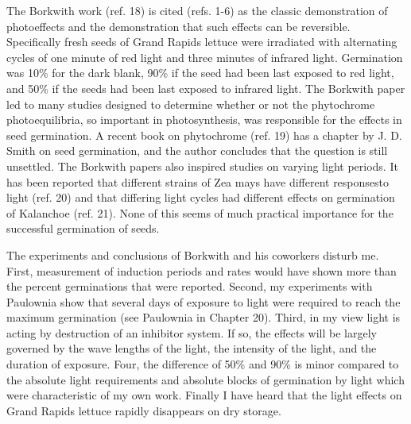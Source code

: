 The Borkwith work (ref. 18) is cited (refs. 1-6) as the classic demonstration of
photoeffects and the demonstration that such effects can be reversible. Specifically
fresh seeds of Grand Rapids lettuce were irradiated with alternating cycles of one
minute of red light and three minutes of infrared light. Germination was 10\% for the
dark blank, 90\% if the seed had been last exposed to red light, and 50\% if the seeds
had been last exposed to infrared light. The Borkwith paper led to many studies
designed to determine whether or not the phytochrome photoequilibria, so important in
photosynthesis, was responsible for the effects in seed germination. A recent book on
phytochrome (ref. 19) has a chapter by J. D. Smith on seed germination, and the
author concludes that the question is still unsettled. The Borkwith papers also inspired
studies on varying light periods. It has been reported that different strains of Zea mays
have different responsesto light (ref. 20) and that differing light cycles had different
effects on germination of Kalanchoe (ref. 21). None of this seems of much practical
importance for the successful germination of seeds.

The experiments and conclusions of Borkwith and his coworkers disturb me.
First, measurement of induction periods and rates would have shown more than the
percent germinations that were reported. Second, my experiments with Paulownia
show that several days of exposure to light were required to reach the maximum
germination (see Paulownia in Chapter 20). Third, in my view light is acting by
destruction of an inhibitor system. If so, the effects will be largely governed by the
wave lengths of the light, the intensity of the light, and the duration of exposure. Four,
the difference of 50\% and 90\% is minor compared to the absolute light requirements
and absolute blocks of germination by light which were characteristic of my own work.
Finally I have heard that the light effects on Grand Rapids lettuce rapidly disappears
on dry storage.

